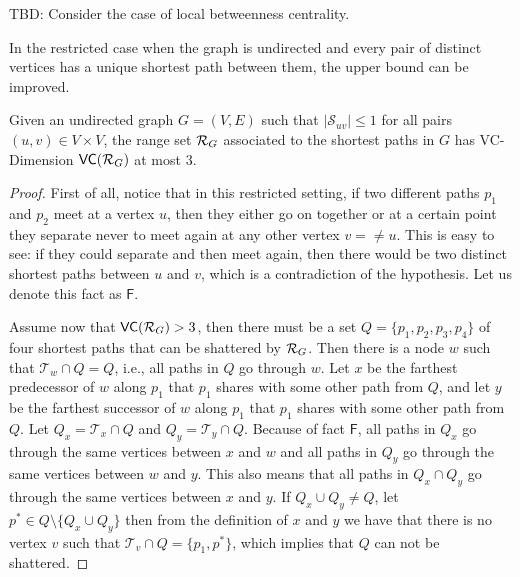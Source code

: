 \XXX TBD: Consider the case of local betweenness centrality. \MR

In the restricted case when the graph is undirected and every pair of distinct vertices
has a unique shortest path between them, the upper bound can be improved.
\begin{lemma}\label{lem:vcdimuppboundunique}
  Given an undirected graph $G=(V,E)$ such that $|\mathcal{S}_{uv}|\le1$ for all
  pairs $(u,v)\in V\times V$, the range set $\mathcal{R}_G$ associated to the
  shortest paths in $G$ has VC-Dimension $\mathsf{VC}(\mathcal{R}_G)$ at most $3$.
\end{lemma}

\begin{proof}
  First of all, notice that in this restricted setting, if two different paths
  $p_1$ and $p_2$ meet at a vertex $u$, then they either go on together or at a
  certain point they separate never to meet again at any other vertex $v=\neq u$.
  This is easy to see: if they could separate and then meet again, then there
  would be two distinct shortest paths between $u$ and $v$, which is a
  contradiction of the hypothesis. Let us denote this fact as $\mathsf{F}$.

  Assume now that $\mathsf{VC}(\mathcal{R}_G)>3$, then there must be a set
  $Q=\{p_1,p_2,p_3,p_4\}$ of four shortest paths that can be shattered by
  $\mathcal{R}_G$. Then there is a node $w$ such that $\mathcal{T}_w\cap Q=Q$, i.e.,
  all paths in $Q$ go through $w$. Let $x$ be the farthest predecessor of $w$
  along $p_1$ that $p_1$ shares with some other path from $Q$, and let $y$ be
  the farthest successor of $w$ along $p_1$ that $p_1$ shares with some other
  path from $Q$. Let $Q_x=\mathcal{T}_x\cap Q$ and $Q_y=\mathcal{T}_y\cap Q$.
  Because of fact $\mathsf{F}$, all paths in $Q_x$ go through the same vertices
  between $x$ and $w$ and all paths in $Q_y$ go through the same vertices
  between $w$ and $y$. This also means that all paths in $Q_x\cap Q_y$ go
  through the same vertices between $x$ and $y$.
  If $Q_x\cup Q_y\neq Q$, let $p^*\in Q\setminus\{Q_x\cup Q_y\}$ then from the
  definition of $x$ and $y$ we have that there is no vertex $v$ such that
  $\mathcal{T}_v\cap Q=\{p_1,p^*\}$, which implies that $Q$ can not be shattered.
  

\end{proof}

